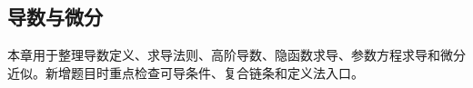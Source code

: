 \subsection{导数与微分}

\begin{knowledgeBox}
本章用于整理导数定义、求导法则、高阶导数、隐函数求导、参数方程求导和微分近似。新增题目时重点检查可导条件、复合链条和定义法入口。
\end{knowledgeBox}
